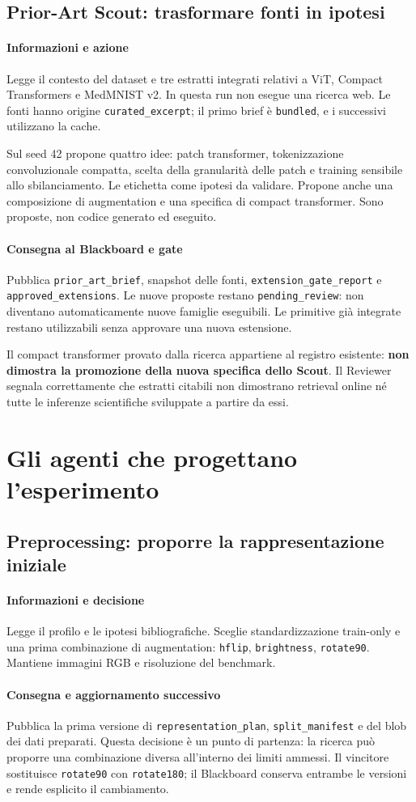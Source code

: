 \documentclass[11pt,a4paper]{article}
\newcommand{\artefatto}[1]{\nolinkurl{#1}}
\newcommand{\ruolo}[1]{\paragraph{#1}}
\begin{document}
\subsection{Prior-Art Scout: trasformare fonti in ipotesi}
\ruolo{Informazioni e azione}
Legge il contesto del dataset e tre estratti integrati relativi a ViT,
Compact Transformers e MedMNIST v2. In questa run non esegue una ricerca web.
Le fonti hanno origine \artefatto{curated_excerpt}; il primo brief è
\artefatto{bundled}, e i successivi utilizzano la cache.

Sul seed 42 propone quattro idee: patch transformer, tokenizzazione
convoluzionale compatta, scelta della granularità delle patch e training
sensibile allo sbilanciamento. Le etichetta come ipotesi da validare.
Propone anche una composizione di augmentation e una specifica di compact
transformer. Sono proposte, non codice generato ed eseguito.

\ruolo{Consegna al Blackboard e gate}
Pubblica \artefatto{prior_art_brief}, snapshot delle fonti,
\artefatto{extension_gate_report} e \artefatto{approved_extensions}.
Le nuove proposte restano \artefatto{pending_review}: non diventano
automaticamente nuove famiglie eseguibili. Le primitive già integrate
restano utilizzabili senza approvare una nuova estensione.

Il compact transformer provato dalla ricerca appartiene al registro esistente:
\textbf{non dimostra la promozione della nuova specifica dello Scout}.
Il Reviewer segnala correttamente che estratti citabili non dimostrano
retrieval online né tutte le inferenze scientifiche sviluppate a partire da essi.

\section{Gli agenti che progettano l'esperimento}

\subsection{Preprocessing: proporre la rappresentazione iniziale}
\ruolo{Informazioni e decisione}
Legge il profilo e le ipotesi bibliografiche. Sceglie standardizzazione
train-only e una prima combinazione di augmentation:
\artefatto{hflip}, \artefatto{brightness}, \artefatto{rotate90}.
Mantiene immagini RGB e risoluzione del benchmark.

\ruolo{Consegna e aggiornamento successivo}
Pubblica la prima versione di \artefatto{representation_plan},
\artefatto{split_manifest} e del blob dei dati preparati.
Questa decisione è un punto di partenza: la ricerca può proporre una
combinazione diversa all'interno dei limiti ammessi. Il vincitore sostituisce
\artefatto{rotate90} con \artefatto{rotate180}; il Blackboard conserva
entrambe le versioni e rende esplicito il cambiamento.
\end{document}
